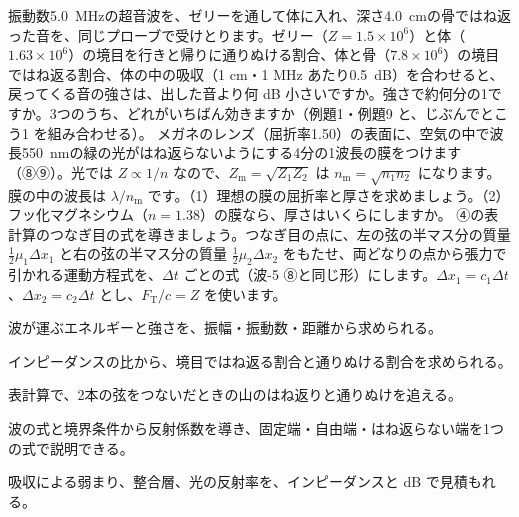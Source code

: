 \bkproblem 振動数\qty{5.0}{MHz}の超音波を、ゼリーを通して体に入れ、深さ\qty{4.0}{cm}の骨ではね返った音を、同じプローブで受けとります。ゼリー（$Z=1.5\times10^6$）と体（$1.63\times10^6$）の境目を行きと帰りに通りぬける割合、体と骨（$7.8\times10^6$）の境目ではね返る割合、体の中の吸収（1 cm・1 MHz あたり\qty{0.5}{dB}）を合わせると、戻ってくる音の強さは、出した音より何 dB 小さいですか。強さで約何分の1ですか。3つのうち、どれがいちばん効きますか（例題1・例題9 と、じぶんでとこう1 を組み合わせる）。
\bkproblem メガネのレンズ（屈折率1.50）の表面に、空気の中で波長\qty{550}{nm}の緑の光がはね返らないようにする4分の1波長の膜をつけます（⑧⑨）。光では $Z\propto1/n$ なので、$Z_{\mathrm m}=\sqrt{Z_1Z_2}$ は $n_{\mathrm m}=\sqrt{n_1n_2}$ になります。膜の中の波長は $\lambda/n_{\mathrm m}$ です。（1）理想の膜の屈折率と厚さを求めましょう。（2）フッ化マグネシウム（$n=1.38$）の膜なら、厚さはいくらにしますか。
\bkproblem ④の表計算のつなぎ目の式を導きましょう。つなぎ目の点に、左の弦の半マス分の質量 $\tfrac12\mu_1\Delta x_1$ と右の弦の半マス分の質量 $\tfrac12\mu_2\Delta x_2$ をもたせ、両どなりの点から張力で引かれる運動方程式を、$\Delta t$ ごとの式（波-5 ⑧と同じ形）にします。$\Delta x_1=c_1\Delta t$、$\Delta x_2=c_2\Delta t$ とし、$F_{\mathrm T}/c=Z$ を使います。

\begin{furikaeri}
\begin{checklist}
\item 波が運ぶエネルギーと強さを、振幅・振動数・距離から求められる。
\item インピーダンスの比から、境目ではね返る割合と通りぬける割合を求められる。
\item 表計算で、2本の弦をつないだときの山のはね返りと通りぬけを追える。
\item 波の式と境界条件から反射係数を導き、固定端・自由端・はね返らない端を1つの式で説明できる。
\item 吸収による弱まり、整合層、光の反射率を、インピーダンスと dB で見積もれる。
\end{checklist}
\end{furikaeri}
